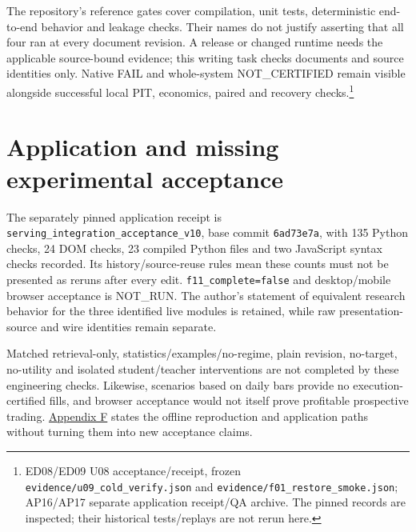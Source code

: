 The repository's reference gates cover compilation, unit tests,
deterministic end-to-end behavior and leakage checks. Their names do not
justify asserting that all four ran at every document revision. A release
or changed runtime needs the applicable source-bound evidence; this
writing task checks documents and source identities only. Native FAIL
and whole-system NOT\_\allowbreak{}CERTIFIED remain visible alongside successful local
PIT, economics, paired and recovery checks.\footnote{ED08/ED09 U08 acceptance/receipt, frozen \texttt{evidence/\allowbreak{}u09\_\allowbreak{}cold\_\allowbreak{}verify.\allowbreak{}json} and \texttt{evidence/\allowbreak{}f01\_\allowbreak{}restore\_\allowbreak{}smoke.\allowbreak{}json}; AP16/AP17 separate application receipt/QA archive. The pinned records are inspected; their historical tests/replays are not rerun here.}

\section{Application and missing experimental acceptance}\label{s:0d31a3ec1702ffa1}

The separately pinned application receipt is
\texttt{serving\_\allowbreak{}integration\_\allowbreak{}acceptance\_\allowbreak{}v10}, base commit \texttt{6ad73e7a}, with
135 Python checks, 24 DOM checks, 23 compiled Python files and two
JavaScript syntax checks recorded. Its history/source-reuse rules mean
these counts must not be presented as reruns after every edit.
\texttt{f11\_\allowbreak{}complete=false} and desktop/mobile browser acceptance is NOT\_\allowbreak{}RUN.
The author's statement of equivalent research behavior for the three
identified live modules is retained, while raw presentation-source and
wire identities remain separate.

Matched retrieval-only, statistics/examples/no-regime, plain revision,
no-target, no-utility and isolated student/teacher interventions are not
completed by these engineering checks. Likewise, scenarios based on
daily bars provide no execution-certified fills, and browser acceptance
would not itself prove profitable prospective trading. \hyperref[s:5f1ea8a5eac1b7a0]{Appendix F} states
the offline reproduction and application paths without turning them into
new acceptance claims.
